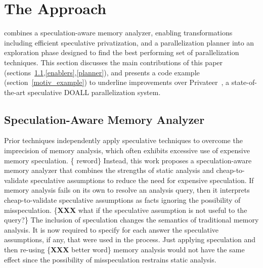 \section{The \name Approach}

\name combines a speculation-aware memory analyzer, enabling
transformations including efficient speculative privatization, and a
parallelization planner into an exploration phase designed to find the
best performing set of parallelization techniques.  This section
discusses the main contributions of this paper
(sections~\ref{analyzer},\ref{enablers},\ref{planner}), and
presents a code example (section~\ref{motiv_example}) to underline
improvements over Privateer~\cite{johnson:12:pldi}, a state-of-the-art
speculative DOALL parallelization system.

\subsection{Speculation-Aware Memory Analyzer}
\label{analyzer}

%
Prior techniques independently apply speculative techniques to
overcome the imprecision of memory analysis, which often exhibits
excessive use of expensive memory speculation. \{ reword\}
%
%
%
%
Instead, this work proposes a speculation-aware memory analyzer that
combines the strengths of static analysis and cheap-to-validate
speculative assumptions to reduce the need for expensive speculation.
If memory analysis fails on its own to resolve an analysis query, then
it interprets cheap-to-validate speculative assumptions as facts
ignoring the possibility of misspeculation. \{\textbf{XXX} what if the
speculative assumption is not useful to the query?\}
%
The inclusion of speculation changes the semantics of traditional memory
analysis. It is now required to specify for each answer the
speculative assumptions, if any, that were used in the process.
%
Just applying speculation and then re-using \{\textbf{XXX} better word\} memory analysis would not
have the same effect since the possibility of misspeculation restrains
static analysis.

%
%

